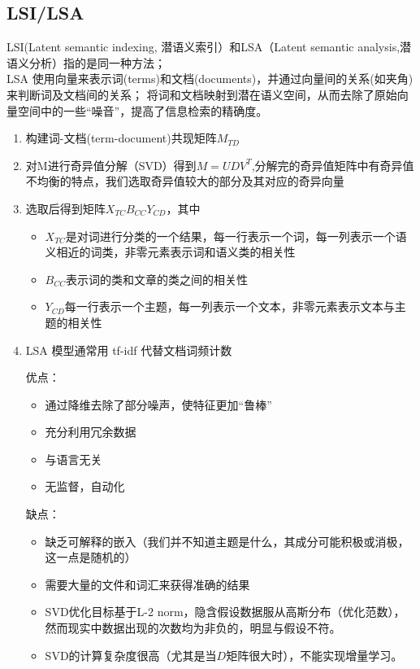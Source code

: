 \documentclass[UTF8]{article}%
\begin{document}
	\subsection{LSI/LSA}
		LSI(Latent semantic indexing, 潜语义索引）和LSA（Latent semantic analysis,潜语义分析）指的是同一种方法；\\
		LSA 使用向量来表示词(terms)和文档(documents)，并通过向量间的关系(如夹角)来判断词及文档间的关系； 将词和文档映射到潜在语义空间，从而去除了原始向量空间中的一些“噪音”，提高了信息检索的精确度。
		\begin{enumerate}
			\item 构建词-文档(term-document)共现矩阵$M_{TD}$
			\item 对M进行奇异值分解（SVD）得到$M=UDV^T$,分解完的奇异值矩阵中有奇异值不均衡的特点，我们选取奇异值较大的部分及其对应的奇异向量
			\item 选取后得到矩阵$X_{TC}B_{CC}Y_{CD}$，其中
				\begin{itemize}
					\item$X_{TC}$是对词进行分类的一个结果，每一行表示一个词，每一列表示一个语义相近的词类，非零元素表示词和语义类的相关性
					\item $B_{CC}$表示词的类和文章的类之间的相关性
					\item $Y_{CD}$每一行表示一个主题，每一列表示一个文本，非零元素表示文本与主题的相关性
				\end{itemize}
			\item \color{red}LSA 模型通常用 tf-idf 代替文档词频计数	
			\color{black}
			
			优点：
				\begin{itemize}
					\item  通过降维去除了部分噪声，使特征更加“鲁棒”
					\item 充分利用冗余数据
					\item 与语言无关
					\item 无监督，自动化
				\end{itemize}
			缺点：
				\begin{itemize}
					\item 缺乏可解释的嵌入（我们并不知道主题是什么，其成分可能积极或消极，这一点是随机的）
					\item 需要大量的文件和词汇来获得准确的结果
					\item SVD优化目标基于L-2 norm，隐含假设数据服从高斯分布（优化范数），然而现实中数据出现的次数均为非负的，明显与假设不符。
					\item SVD的计算复杂度很高（尤其是当$D$矩阵很大时），不能实现增量学习。
				\end{itemize}	
		\end{enumerate}
\end{document}
